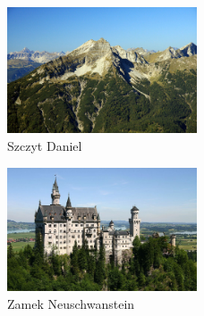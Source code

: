 \documentclass[a4paper,12pt]{article}
\begin{document}
\begin{figure}[p]
\begin{center}
\includegraphics[width=0.5\textwidth]{pics/daniel.jpg} 
\caption{Szczyt Daniel}
\label{fig:Daniel}
\end{center}
\end{figure}

\begin{figure}[p]
\begin{center}
\includegraphics[width=0.5\textwidth]{pics/zamek.jpg} 
\caption{Zamek Neuschwanstein}
\label{fig:Zamek}
\end{center}
\end{figure}
\end{document}
